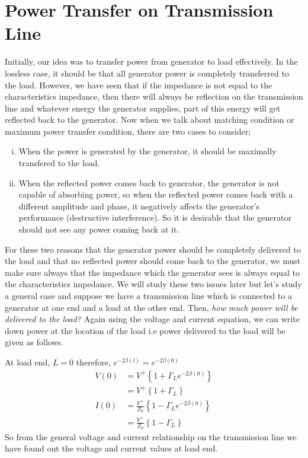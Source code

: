 \section{Power Transfer on Transmission Line}
Initially, our idea was to transfer power from generator to load effectively. In the lossless case, it should be that all generator power is completely transferred to the load. However, we have seen that if the impedance is not equal to the characteristics impedance, then there will always be reflection on the transmission line and whatever energy the generator supplies, part of this energy will get reflected back to the generator. Now when we talk about matching condition or maximum power transfer condition, there are two cases to consider;
\begin{enumerate}[(i)]
\item When the power is generated by the generator, it should be maximally transfered to the load.
\item When the reflected power comes back to generator, the generator is not capable of absorbing power, so when the reflected power comes back with a different amplitude and phase, it negatively affects the generator's performance (destructive interference). So it is desirable that the generator should not see any power coming back at it.
\end{enumerate}
For these two reasons that the generator power should be completely delivered to the load and that no reflected power should come back to the generator, we must make sure always that the impedance which the generator sees is always equal to the characteristics impedance. We will study these two issues later but let's study a general case and suppose we have a transmission line which is connected to a generator at  one end and a load at the other end. Then, \emph{how much power will be delivered to the load?} Again using the voltage and current equation, we can write down power at the location of the load i.e power delivered to the load will be given as follows.

At load end, $L=0$ therefore, $e^{-2\beta (l)} = e^{-2\beta (0)}$
\begin{align*}
V(0) &= V^{+} \left\lbrace {1 + \Gamma_L e^{-2\beta(0)}}\right\rbrace\\ 
&= V^{+}\left\lbrace 1 +\Gamma_L \right\rbrace\\
I(0) &= \frac{V^{+}}{Z_0} \left\lbrace{1 - \Gamma_L e^{-2\beta(0)}}\right\rbrace\\ 
&= \frac{V^{+}}{Z_0}\left\lbrace1 -\Gamma_L \right\rbrace
\end{align*}
So from the general voltage and current relationship on the transmission line we have found  out the voltage and current values at load end.

